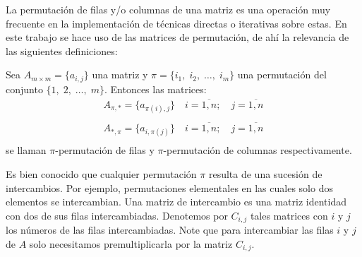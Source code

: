 La permutación de filas y/o columnas de una matriz es una operación muy frecuente en la implementación de técnicas directas o iterativas sobre estas. En este trabajo se hace uso de las matrices de permutaci\'on, de ah\'i la relevancia de las siguientes definiciones:

\begin{definition}\label{def:permutation}
	Sea $A_{m \times m} = \{a_{i,j}\}$ una matriz y $\pi = \{i_1,\; i_2,\; \dots,\; i_m\}$ una permutaci\'on del conjunto $\{1,\; 2,\; \dots,\; m\}$. Entonces las matrices:
	\begin{equation}
		\begin{array}{c}
			A_{\pi,\ast} = \{a_{\pi(i),j}\}\quad i=\overline{1,n}; \quad j=\overline{1,n}\\
			\\
			A_{\ast,\pi} = \{a_{i,\pi(j)}\}\quad i=\overline{1,n}; \quad j=\overline{1,n}\\
		\end{array}
	\end{equation}
	se llaman $\pi$-permutaci\'on de filas y $\pi$-permutaci\'on de columnas respectivamente.
\end{definition}

Es bien conocido que cualquier permutación $\pi$ resulta de una sucesi\'on de intercambios. Por ejemplo, permutaciones elementales en las cuales solo dos elementos se intercambian. Una matriz de intercambio es una matriz identidad con dos de sus filas intercambiadas. Denotemos por $C_{i,j}$ tales matrices con $i$ y $j$ los números de las filas intercambiadas. Note que para intercambiar las filas $i$ y $j$ de $A$ solo necesitamos premultiplicarla por la matriz $C_{i,j}$.

